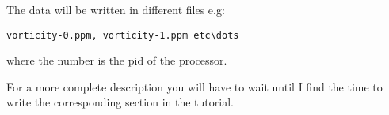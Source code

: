 \documentclass[a4paper]{article}
\begin{document}
The data will be written in different files e.g:
\begin{verbatim}
vorticity-0.ppm, vorticity-1.ppm etc\dots
\end{verbatim}
where the number is the pid of the processor.

For a more complete description you will have to wait until I find the
time to write the corresponding section in the tutorial.
\end{document}
